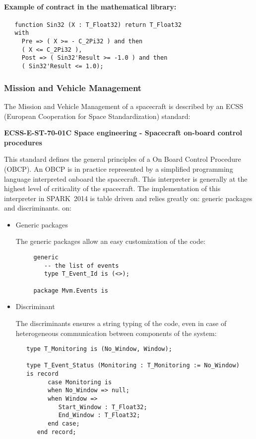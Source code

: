 \documentclass[10pt,a4paper,twocolumn]{article}
\newcommand{\newspark}{SPARK~2014\xspace}
\begin{document}
\ifdefined\abstractonly
\else
\paragraph{Example of contract in the mathematical library:}

\begin{verbatim}
   function Sin32 (X : T_Float32) return T_Float32
   with
     Pre => ( X >= - C_2Pi32 ) and then
     ( X <= C_2Pi32 ),
     Post => ( Sin32'Result >= -1.0 ) and then
     ( Sin32'Result <= 1.0);
\end{verbatim}
\fi

\subsubsection{Mission and Vehicle Management}

The Mission and Vehicle Management of a spacecraft is described by an ECSS (European Cooperation for Space Standardization) standard:

\begin{center}
{\bf ECSS-E-ST-70-01C Space engineering - Spacecraft on-board control procedures}
\end{center}

This standard defines the general principles of a On Board Control Procedure (OBCP). An OBCP is in practice represented by a simplified programming language interpreted onboard the spacecraft. This interpreter is generally at the highest level of criticality of the spacecraft. The implementation of this interpreter in \newspark is table driven and relies greatly
\ifdefined\abstractonly
on: generic packages and discriminants.
\else
on:
\begin{itemize}
\item Generic packages

	The generic packages allow an easy customization of the code:

	\begin{verbatim}
     generic
        -- the list of events
        type T_Event_Id is (<>);

     package Mvm.Events is
	\end{verbatim}

\item Discriminant

	The discriminants ensures a string typing of the code, even in case of heterogeneous communication between components of the system:

	\begin{verbatim}
   type T_Monitoring is (No_Window, Window);

   type T_Event_Status (Monitoring : T_Monitoring := No_Window)
   is record
         case Monitoring is
         when No_Window => null;
         when Window =>
            Start_Window : T_Float32;
            End_Window : T_Float32;
         end case;
      end record;
	\end{verbatim}
\end{itemize}
\fi
\end{document}
